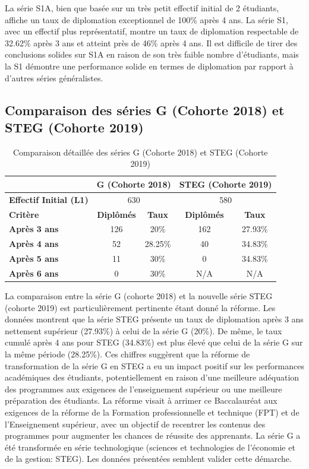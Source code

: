 La série S1A, bien que basée sur un très petit effectif initial de 2 étudiants, affiche un taux de diplomation exceptionnel de 100\% après 4 ans. 
La série S1, avec un effectif plus représentatif, montre un taux de diplomation respectable de 32.62\% après 3 ans et atteint près de 46\% après 4 ans. 
Il est difficile de tirer des conclusions solides sur S1A en raison de son très faible nombre d'étudiants, mais la S1 démontre une performance solide en termes de diplomation par rapport à d'autres séries généralistes.

\subsection{Comparaison des séries G (Cohorte 2018) et STEG (Cohorte 2019)}

\begin{table}[htbp]
\centering
\caption{Comparaison détaillée des séries G (Cohorte 2018) et STEG (Cohorte 2019)}
\begin{tabular}{l|c|c|c|c|}
\cline{2-5}
& \multicolumn{2}{c|}{\textbf{G (Cohorte 2018)}} & \multicolumn{2}{c|}{\textbf{STEG (Cohorte 2019)}} \\
\hline
\textbf{Effectif Initial (L1)} & \multicolumn{2}{c|}{630} & \multicolumn{2}{c|}{580} \\
\hline
\textbf{Critère} & \textbf{Diplômés} & \textbf{Taux} & \textbf{Diplômés} & \textbf{Taux} \\
\hline
\textbf{Après 3 ans} & 126 & 20\% & 162 & 27.93\% \\
\textbf{Après 4 ans} & 52 & 28.25\% & 40 & 34.83\% \\
\textbf{Après 5 ans} & 11 & 30\% & 0 & 34.83\% \\
\textbf{Après 6 ans} & 0 & 30\% & N/A & N/A \\
\hline
\end{tabular}
\end{table}

La comparaison entre la série G (cohorte 2018) et la nouvelle série STEG (cohorte 2019) est particulièrement pertinente étant donné la réforme. Les données montrent que la série STEG présente un taux de diplomation après 3 ans nettement supérieur (27.93\%) à celui de la série G (20\%). De même, le taux cumulé après 4 ans pour STEG (34.83\%) est plus élevé que celui de la série G sur la même période (28.25\%). 
Ces chiffres suggèrent que la réforme de transformation de la série G en STEG a eu un impact positif sur les performances académiques des étudiants, potentiellement en raison d'une meilleure adéquation des programmes aux exigences de l'enseignement supérieur ou une meilleure préparation des étudiants.
La réforme visait à arrimer ce Baccalauréat aux exigences de la réforme de la Formation professionnelle et technique (FPT) et de l'Enseignement supérieur, avec un objectif de recentrer les contenus des programmes pour augmenter les chances de réussite des apprenants. La série G a été transformée en série technologique (sciences et technologies de l'économie et de la gestion: STEG).
Les données présentées semblent valider cette démarche.

